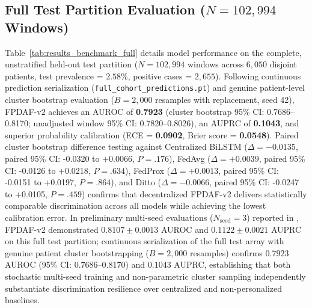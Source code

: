 \documentclass[final,5p,times,twocolumn]{elsarticle}
\begin{document}
\begin{table}[!t]
\caption*{\footnotesize \textit{Note:} Operating metrics evaluated at default threshold $\tau=0.50$. Unadjusted 95\% CIs are derived via Hanley-McNeil (1982). Cluster bootstrap 95\% CIs are derived via genuine patient-level cluster bootstrap ($B=2,000$ resamples with replacement, seed 42) retaining all trajectory windows per sampled patient encounter. Models are partitioned into Panel A (client-stratified sampling: 5,000 windows per hospital node, 408 positives, prevalence 2.72\%, $M=4,127$ patients) and Panel B (uniform multi-center pooled sampling: 387 positives, prevalence 2.58\%, $M=4,207$ patients). Cross-panel comparisons reflect differing empirical sampling structures and must not be interpreted as direct matched comparisons. ECE = Expected Calibration Error; Brier Score measures probability mean squared error.}
\end{table}

\subsection{Full Test Partition Evaluation ($N=102,994$ Windows)}
Table~\ref{tab:results_benchmark_full} details model performance on the complete, unstratified held-out test partition ($N=102,994$ windows across $6,050$ disjoint patients, test prevalence = $2.58\%$, positive cases = $2,655$). Following continuous prediction serialization (\texttt{full\_cohort\_predictions.pt}) and genuine patient-level cluster bootstrap evaluation ($B=2,000$ resamples with replacement, seed 42), FPDAF-v2 achieves an AUROC of \textbf{0.7923} (cluster bootstrap 95\% CI: 0.7686--0.8170; unadjusted window 95\% CI: 0.7820--0.8026), an AUPRC of \textbf{0.1043}, and superior probability calibration (ECE = \textbf{0.0902}, Brier score = \textbf{0.0548}). Paired cluster bootstrap difference testing against Centralized BiLSTM ($\Delta = -0.0135$, paired 95\% CI: -0.0320 to +0.0066, $P = .176$), FedAvg ($\Delta = +0.0039$, paired 95\% CI: -0.0126 to +0.0218, $P = .634$), FedProx ($\Delta = +0.0013$, paired 95\% CI: -0.0151 to +0.0197, $P = .864$), and Ditto ($\Delta = -0.0066$, paired 95\% CI: -0.0247 to +0.0105, $P = .459$) confirms that decentralized FPDAF-v2 delivers statistically comparable discrimination across all models while achieving the lowest calibration error. In preliminary multi-seed evaluations ($N_{\text{seed}}=3$) reported in \cite{sakhi2026drift}, FPDAF-v2 demonstrated $0.8107 \pm 0.0013$ AUROC and $0.1122 \pm 0.0021$ AUPRC on this full test partition; continuous serialization of the full test array with genuine patient cluster bootstrapping ($B=2,000$ resamples) confirms $0.7923$ AUROC (95\% CI: 0.7686--0.8170) and $0.1043$ AUPRC, establishing that both stochastic multi-seed training and non-parametric cluster sampling independently substantiate discrimination resilience over centralized and non-personalized baselines.
\end{document}
